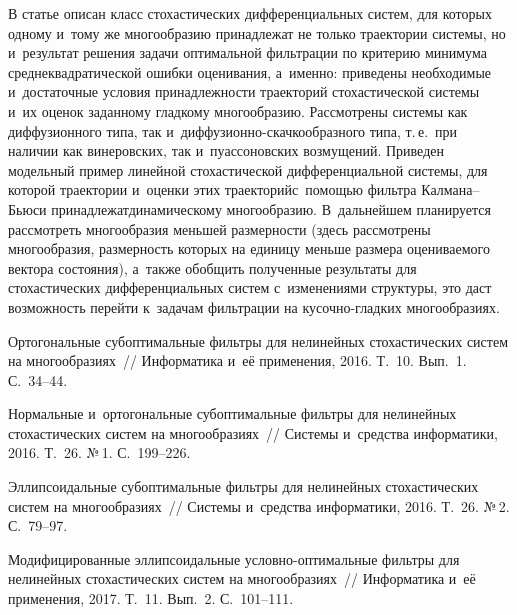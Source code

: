 \begin{multicols}{2}
В статье описан класс стохастических дифференциальных систем, 
для которых одному и~тому же многообразию принадлежат не только 
траектории системы, но и~результат решения задачи оптимальной 
фильтрации по критерию минимума среднеквадратической ошибки оценивания, 
а~именно: приведены необходимые и~достаточные условия принадлежности траекторий 
стохастической системы и~их оценок заданному гладкому многообразию. Рассмотрены 
системы как диффузионного типа, так и~диф\-фу\-зи\-он\-но-скач\-ко\-об\-раз\-но\-го 
типа, т.\,е.\ 
при наличии как винеровских, так и~пуассоновских возмущений. Приведен модельный 
пример линейной стохастической дифференциальной системы, для которой 
траектории и~оценки этих траекторий\linebreak с~по\-мощью фильтра Кал\-ма\-на--Бью\-си 
принадлежат\linebreak динамическому многообразию. В~дальнейшем планируется рассмотреть 
многообразия меньшей размерности (здесь рассмотрены многообразия, размерность 
которых на единицу меньше размера оценива\-емо\-го вектора состояния), а~также 
обобщить полученные результаты для стохастических дифференциальных сис\-тем с~изменениями 
структуры, это даст возможность перейти к~задачам фильт\-ра\-ции на 
ку\-соч\-но-глад\-ких многообразиях.


{\small\frenchspacing
 {%
 \begin{thebibliography}{99}



 Ортогональные субоптимальные 
фильтры для нелинейных стохастических систем на многообразиях~// Информатика и~её 
применения, 2016. Т.~10. Вып.~1. С.~34--44.

 Нормальные и~ортогональные субоптимальные 
фильтры для нелинейных стохастических систем на многообразиях~// 
Системы и~средства информатики, 2016. Т.~26. №\,1. С.~199--226.

Эллипсоидальные субоптимальные фильтры для нелинейных стохастических 
систем на многообразиях~// Системы и~средства информатики, 2016. Т.~26. №\,2. С.~79--97.

 Модифицированные 
эллипсоидальные услов\-но-оп\-ти\-маль\-ные фильтры для нелинейных стохастических 
систем на многообразиях~// Информатика и~её применения, 2017. Т.~11. Вып.~2. С.~101--111.


\end{thebibliography}}}
\end{multicols}

